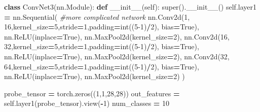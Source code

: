 \documentclass[10pt,a4paper]{article}
\newenvironment{Shaded}{\begin{snugshade}}{\end{snugshade}}
\newcommand{\BuiltInTok}[1]{#1}
\newcommand{\CommentTok}[1]{\textcolor[rgb]{0.56,0.35,0.01}{\textit{#1}}}
\newcommand{\DecValTok}[1]{\textcolor[rgb]{0.00,0.00,0.81}{#1}}
\newcommand{\FunctionTok}[1]{\textcolor[rgb]{0.00,0.00,0.00}{#1}}
\newcommand{\KeywordTok}[1]{\textcolor[rgb]{0.13,0.29,0.53}{\textbf{#1}}}
\newcommand{\NormalTok}[1]{#1}
\newcommand{\OperatorTok}[1]{\textcolor[rgb]{0.81,0.36,0.00}{\textbf{#1}}}
\newcommand{\VariableTok}[1]{\textcolor[rgb]{0.00,0.00,0.00}{#1}}
\theoremstyle{break}
\begin{document}
\begin{Shaded}
\begin{Highlighting}[]
\KeywordTok{class}\NormalTok{ ConvNet3(nn.Module):}
    \KeywordTok{def} \FunctionTok{__init__}\NormalTok{(}\VariableTok{self}\NormalTok{):}
        \BuiltInTok{super}\NormalTok{().}\FunctionTok{__init__}\NormalTok{()}
        \VariableTok{self}\NormalTok{.layer1 }\OperatorTok{=}\NormalTok{ nn.Sequential( }\CommentTok{#more complicated network}
\NormalTok{            nn.Conv2d(}\DecValTok{1}\NormalTok{, }\DecValTok{16}\NormalTok{,kernel_size}\OperatorTok{=}\DecValTok{5}\NormalTok{,stride}\OperatorTok{=}\DecValTok{1}\NormalTok{,padding}\OperatorTok{=}\BuiltInTok{int}\NormalTok{((}\DecValTok{5-1}\NormalTok{)}\OperatorTok{/}\DecValTok{2}\NormalTok{), bias}\OperatorTok{=}\VariableTok{True}\NormalTok{),}
\NormalTok{            nn.ReLU(inplace}\OperatorTok{=}\VariableTok{True}\NormalTok{),}
\NormalTok{            nn.MaxPool2d(kernel_size}\OperatorTok{=}\DecValTok{2}\NormalTok{),}
\NormalTok{            nn.Conv2d(}\DecValTok{16}\NormalTok{, }\DecValTok{32}\NormalTok{,kernel_size}\OperatorTok{=}\DecValTok{5}\NormalTok{,stride}\OperatorTok{=}\DecValTok{1}\NormalTok{,padding}\OperatorTok{=}\BuiltInTok{int}\NormalTok{((}\DecValTok{5-1}\NormalTok{)}\OperatorTok{/}\DecValTok{2}\NormalTok{), bias}\OperatorTok{=}\VariableTok{True}\NormalTok{),}
\NormalTok{            nn.ReLU(inplace}\OperatorTok{=}\VariableTok{True}\NormalTok{),}
\NormalTok{            nn.MaxPool2d(kernel_size}\OperatorTok{=}\DecValTok{2}\NormalTok{),}
\NormalTok{            nn.Conv2d(}\DecValTok{32}\NormalTok{, }\DecValTok{64}\NormalTok{,kernel_size}\OperatorTok{=}\DecValTok{5}\NormalTok{,stride}\OperatorTok{=}\DecValTok{1}\NormalTok{,padding}\OperatorTok{=}\BuiltInTok{int}\NormalTok{((}\DecValTok{5-1}\NormalTok{)}\OperatorTok{/}\DecValTok{2}\NormalTok{), bias}\OperatorTok{=}\VariableTok{True}\NormalTok{),}
\NormalTok{            nn.ReLU(inplace}\OperatorTok{=}\VariableTok{True}\NormalTok{),}
\NormalTok{            nn.MaxPool2d(kernel_size}\OperatorTok{=}\DecValTok{2}\NormalTok{)}
\NormalTok{        )}
        
\NormalTok{        probe_tensor }\OperatorTok{=}\NormalTok{ torch.zeros((}\DecValTok{1}\NormalTok{,}\DecValTok{1}\NormalTok{,}\DecValTok{28}\NormalTok{,}\DecValTok{28}\NormalTok{))}
\NormalTok{        out_features }\OperatorTok{=} \VariableTok{self}\NormalTok{.layer1(probe_tensor).view(}\OperatorTok{-}\DecValTok{1}\NormalTok{)}
\NormalTok{        num_classes }\OperatorTok{=} \DecValTok{10} 
        

\end{Highlighting}
\end{Shaded}
\end{document}
